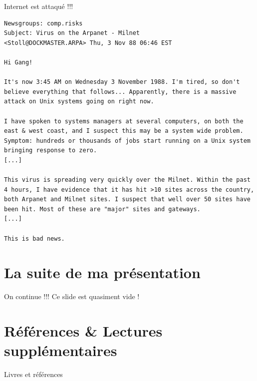 \begin{frame}[fragile]{Internet est attaqué !!!}
\vfill
{\footnotesize
\begin{verbatim}
Newsgroups: comp.risks
Subject: Virus on the Arpanet - Milnet
<Stoll@DOCKMASTER.ARPA> Thu, 3 Nov 88 06:46 EST

Hi Gang!

It's now 3:45 AM on Wednesday 3 November 1988. I'm tired, so don't
believe everything that follows... Apparently, there is a massive
attack on Unix systems going on right now.

I have spoken to systems managers at several computers, on both the
east & west coast, and I suspect this may be a system wide problem.
Symptom: hundreds or thousands of jobs start running on a Unix system
bringing response to zero.
[...]

This virus is spreading very quickly over the Milnet. Within the past
4 hours, I have evidence that it has hit >10 sites across the country,
both Arpanet and Milnet sites. I suspect that well over 50 sites have
been hit. Most of these are "major" sites and gateways.
[...]

This is bad news.
\end{verbatim}
}
\end{frame}


\section{La suite de ma présentation}

\begin{frame}{On continue !!!}
  \vfill
  Ce slide est quasiment vide !
  \vfill
\end{frame}


\section{Références \& Lectures supplémentaires}

\nocite{*}


\begin{frame}[allowframebreaks]{Livres et références}
  
\end{frame}

\begin{frame}{}
  \vfill
  \centering
  \vfill
\end{frame}
